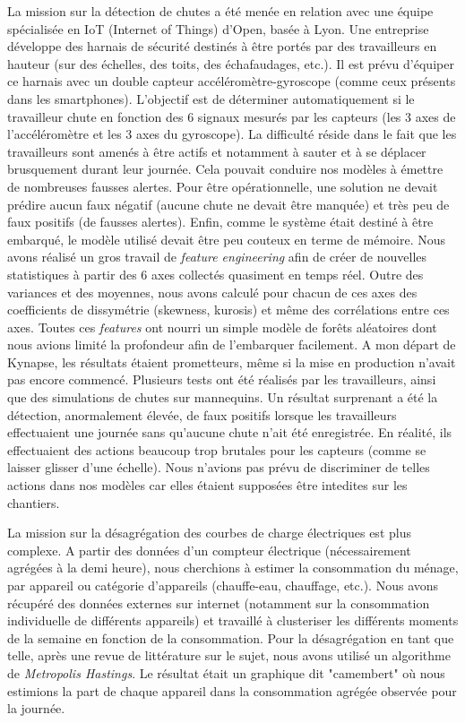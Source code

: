 \documentclass[a4paper]{article}
\begin{document}
	La mission sur la détection de chutes a été menée en relation avec une équipe spécialisée en IoT (Internet of Things) d'Open, basée à Lyon. Une entreprise développe des harnais de sécurité destinés à être portés par des travailleurs en hauteur (sur des échelles, des toits, des échafaudages, etc.). Il est prévu d'équiper ce harnais avec un double capteur accéléromètre-gyroscope (comme ceux présents dans les smartphones). L'objectif est de déterminer automatiquement si le travailleur chute en fonction des 6 signaux mesurés par les capteurs (les 3 axes de l'accéléromètre et les 3 axes du gyroscope). La difficulté réside dans le fait que les travailleurs sont amenés à être actifs et notamment à sauter et à se déplacer brusquement durant leur journée. Cela pouvait conduire nos modèles à émettre de nombreuses fausses alertes. Pour être opérationnelle, une solution ne devait prédire aucun faux négatif (aucune chute ne devait être manquée) et très peu de faux positifs (de fausses alertes). Enfin, comme le système était destiné à être embarqué, le modèle utilisé devait être peu couteux en terme de mémoire. Nous avons réalisé un gros travail de \emph{feature engineering} afin de créer de nouvelles statistiques à partir des 6 axes collectés quasiment en temps réel. Outre des variances et des moyennes, nous avons calculé pour chacun de ces axes des coefficients de dissymétrie (skewness, kurosis) et même des corrélations entre ces axes. Toutes ces \emph{features} ont nourri un simple modèle de forêts aléatoires dont nous avions limité la profondeur afin de l'embarquer facilement. A mon départ de Kynapse, les résultats étaient prometteurs, même si la mise en production n'avait pas encore commencé. Plusieurs tests ont été réalisés par les travailleurs, ainsi que des simulations de chutes sur mannequins. Un résultat surprenant a été la détection, anormalement élevée, de faux positifs lorsque les travailleurs effectuaient une journée sans qu'aucune chute n'ait été enregistrée. En réalité, ils effectuaient des actions beaucoup trop brutales pour les capteurs (comme se laisser glisser d'une échelle). Nous n'avions pas prévu de discriminer de telles actions dans nos modèles car elles étaient supposées être intedites sur les chantiers. 
	
	La mission sur la désagrégation des courbes de charge électriques est plus complexe. A partir des données d'un compteur électrique (nécessairement agrégées à la demi heure), nous cherchions à estimer la consommation du ménage, par appareil ou catégorie d'appareils (chauffe-eau, chauffage, etc.). Nous avons récupéré des données externes sur internet (notamment sur la consommation individuelle de différents appareils) et travaillé à clusteriser les différents moments de la semaine en fonction de la consommation. Pour la désagrégation en tant que telle, après une revue de littérature sur le sujet, nous avons utilisé un algorithme de \emph{Metropolis Hastings}. Le résultat était un graphique dit "camembert" où nous estimions la part de chaque appareil dans la consommation agrégée observée pour la journée.
	
\end{document}
